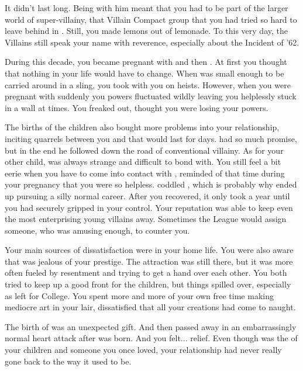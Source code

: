 \documentclass[char]{LRSguildcamp1}
\begin{document}
It didn't last long. Being with him meant that you had to be part of the larger world of super-villainy, that Villain Compact group that you had tried so hard to leave behind in \pSuperSchool{}. Still, you made lemons out of lemonade. To this very day, the Villains still speak your name with reverence, especially about the Incident of '62. 

During this decade, you became pregnant with \cOldest{} and then \cArchitect{}. At first you thought that nothing in your life would have to change. When \cOldest{} was small enough to be carried around in a sling, you took \cOldest{\them} with you on heists. However, when you were pregnant with \cArchitect{} suddenly you powers fluctuated wildly leaving you helplessly stuck in a wall at times. You freaked out, thought you were losing your powers. 

The births of the children also bought more problems into your relationship, inciting quarrels between you and \cGS{\intro} that would last for days. \cOldest{} had so much promise, but in the end he followed \cGS{\intro} down the road of conventional villainy. As for your other child, \cArchitect{} was always strange and difficult to bond with. You still feel a bit eerie when you have to come into contact with \cArchitect{} , reminded of that time during your pregnancy that you were so helpless. \cGS{} coddled \cArchitect{\them}, which is probably why \cArchitect{\they} ended up pursuing a silly normal career. 
After you recovered,  it only took a year until you had securely gripped \pCityGrandma{} in your control. Your reputation was able to keep even the most enterprising young villains away. Sometimes the League would assign someone, who was amusing enough, to counter you. 

Your main sources of dissatisfaction were in your home life. You were also aware that \cGS{\intro} was jealous of your prestige. The attraction was still there, but it was more often fueled by resentment and trying to get a hand over each other.  You both tried to keep up a good front for the children, but things spilled over, especially as \cOldest{} left for College. You spent more and more of your own free time making mediocre art in your lair, dissatisfied that all your creations had come to naught. 

The birth of \cYoungest{} was an unexpected gift. And then \cGS{\intro} passed away in an embarrassingly normal heart attack after \cYoungest{} was born. And you felt... relief. Even though \cGS{\intro} was the \cGS{\parent} of your children and someone you once loved, your relationship had never really gone back to the way it used to be.  
\end{document}
